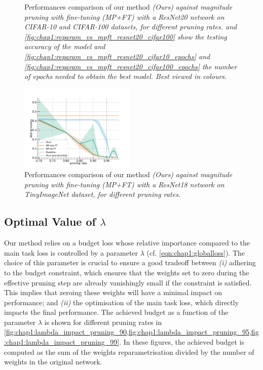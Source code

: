 \begin{figure}
  \caption{ Performances comparison of our method \em{(Ours)} against
    magnitude pruning with fine-tuning \em{(MP+FT)} with a ResNet20 network on
    CIFAR-10 and CIFAR-100 datasets, for different pruning rates.
     and
    \cref{fig:chap1:reparam_vs_mpft_resnet20_cifar100} show the
    testing accuracy of the model and
    \cref{fig:chap1:reparam_vs_mpft_resnet20_cifar10_epochs} and
    \cref{fig:chap1:reparam_vs_mpft_resnet20_cifar100_epochs}
    the number of epochs needed to obtain the best model. Best viewed in colours.}
  \label{fig:chap1:reparam_vs_mpft_resnet20}
\end{figure}


\begin{figure}
  \centering
  \includegraphics[width=0.49\textwidth]{chapter_1/assets/reparam_vs_mpft_PrunableResNet18_tinyimagenet.pdf}
  \caption{Performances comparison of our method \em{(Ours)} against
    magnitude pruning with fine-tuning \em{(MP+FT)} with a ResNet18 network on
    TinyImageNet dataset, for different pruning rates.}
  \label{fig:chap1:reparam_vs_mpft_resnet18}
\end{figure}



\subsection{Optimal Value of \texorpdfstring{$\lambda$}{Lambda}}
\label{sec:chap1:impact_of_lambda}


Our method relies on a budget loss whose relative importance compared to the
main task loss is controlled by a parameter $\lambda$ (cf.
\cref{eqn:chap1:globalloss}). The choice of this parameter is crucial to ensure
a good tradeoff between \emph{(i)} adhering to the budget constraint, which
ensures that the weights set to zero during the effective pruning step are
already vanishingly small if the constraint is satisfied. This implies that
zeroing these weights will have a minimal impact on performance; and \emph{(ii)}
the optimisation of the main task loss, which directly impacts the final
performance. The achieved budget as a function of the parameter $\lambda$ is
shown for different pruning rates in
\cref{fig:chap1:lambda_impact_pruning_90,fig:chap1:lambda_impact_pruning_95,fig:chap1:lambda_impact_pruning_99}.
In these figures, the achieved budget is computed as the sum of the weights
reparametrisation divided by the number of weights in the original network.\\

